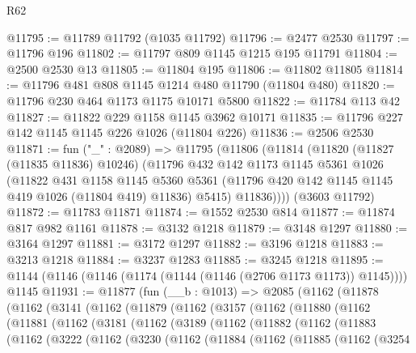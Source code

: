 \begin{lexlean}{R62}
\begin{coremodule}
@11795 := @11789 @11792 (@1035 @11792)
@11796 := @2477 @2530
@11797 := @11796 @196
@11802 := @11797 @809 @1145 @1215 @195 @11791
@11804 := @2500 @2530 @13
@11805 := @11804 @195
@11806 := @11802 @11805
@11814 := @11796 @481 @808 @1145 @1214 @480 @11790 (@11804 @480)
@11820 := @11796 @230 @464 @1173 @1175 @10171 @5800
@11822 := @11784 @113 @42
@11827 := @11822 @229 @1158 @1145 @3962 @10171
@11835 := @11796 @227 @142 @1145 @1145 @226 @1026 (@11804 @226)
@11836 := @2506 @2530
@11871 := fun ("_" : @2089) =>
  @11795
    (@11806
      (@11814
        (@11820
          (@11827 (@11835 @11836) @10246)
          (@11796
            @432
            @142
            @1173
            @1145
            @5361
            @1026
            (@11822
              @431
              @1158
              @1145
              @5360
              @5361
              (@11796 @420 @142 @1145 @1145 @419 @1026 (@11804 @419) @11836)
              @5415)
            @11836))))
    (@3603 @11792)
@11872 := @11783 @11871
@11874 := @1552 @2530 @814
@11877 := @11874 @817 @982 @1161
@11878 := @3132 @1218
@11879 := @3148 @1297
@11880 := @3164 @1297
@11881 := @3172 @1297
@11882 := @3196 @1218
@11883 := @3213 @1218
@11884 := @3237 @1283
@11885 := @3245 @1218
@11895 := @1144 (@1146 (@1146 (@1174 (@1144 (@1146 (@2706 @1173 @1173)) @1145)))) @1145
@11931 := @11877
    (fun (__b : @1013) =>
    @2085
      (@1162
        (@11878
          (@1162
            (@3141
              (@1162
                (@11879
                  (@1162
                    (@3157
                      (@1162
                        (@11880
                          (@1162
                            (@11881
                              (@1162
                                (@3181
                                  (@1162
                                    (@3189
                                      (@1162
                                        (@11882
                                          (@1162
                                            (@11883
                                              (@1162
                                                (@3222
                                                  (@1162
                                                    (@3230
                                                      (@1162
                                                        (@11884
                                                          (@1162
                                                            (@11885
                                                              (@1162
                                                                (@3254

\end{coremodule}
\end{lexlean}
